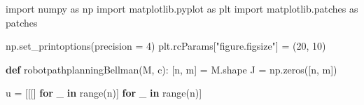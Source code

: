 \documentclass[
]{article}
\newenvironment{Shaded}{\begin{snugshade}}{\end{snugshade}}
\newcommand{\BuiltInTok}[1]{\textcolor[rgb]{0.00,0.23,0.31}{#1}}
\newcommand{\ControlFlowTok}[1]{\textcolor[rgb]{0.00,0.23,0.31}{\textbf{#1}}}
\newcommand{\DecValTok}[1]{\textcolor[rgb]{0.68,0.00,0.00}{#1}}
\newcommand{\ImportTok}[1]{\textcolor[rgb]{0.00,0.46,0.62}{#1}}
\newcommand{\KeywordTok}[1]{\textcolor[rgb]{0.00,0.23,0.31}{\textbf{#1}}}
\newcommand{\NormalTok}[1]{\textcolor[rgb]{0.00,0.23,0.31}{#1}}
\newcommand{\OperatorTok}[1]{\textcolor[rgb]{0.37,0.37,0.37}{#1}}
\newcommand{\StringTok}[1]{\textcolor[rgb]{0.13,0.47,0.30}{#1}}
\begin{document}
\begin{Shaded}
\begin{Highlighting}[]
\ImportTok{import}\NormalTok{ numpy }\ImportTok{as}\NormalTok{ np}
\ImportTok{import}\NormalTok{ matplotlib.pyplot }\ImportTok{as}\NormalTok{ plt}
\ImportTok{import}\NormalTok{ matplotlib.patches }\ImportTok{as}\NormalTok{ patches}

\NormalTok{np.set\_printoptions(precision }\OperatorTok{=} \DecValTok{4}\NormalTok{)}
\NormalTok{plt.rcParams[}\StringTok{"figure.figsize"}\NormalTok{] }\OperatorTok{=}\NormalTok{ (}\DecValTok{20}\NormalTok{, }\DecValTok{10}\NormalTok{)}
\end{Highlighting}
\end{Shaded}

\begin{Shaded}
\begin{Highlighting}[]
\KeywordTok{def}\NormalTok{ robotpathplanningBellman(M, c):}
\NormalTok{    [n, m] }\OperatorTok{=}\NormalTok{ M.shape}
\NormalTok{    J }\OperatorTok{=}\NormalTok{ np.zeros([n, m])}

\NormalTok{    u }\OperatorTok{=}\NormalTok{ [[[] }\ControlFlowTok{for}\NormalTok{ \_ }\KeywordTok{in} \BuiltInTok{range}\NormalTok{(n)] }\ControlFlowTok{for}\NormalTok{ \_ }\KeywordTok{in} \BuiltInTok{range}\NormalTok{(n)]}


\end{Highlighting}
\end{Shaded}
\end{document}
